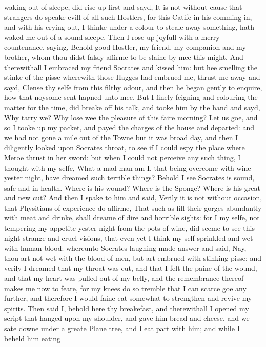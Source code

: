 waking out of sleepe, did rise up first and sayd, It is not without cause that
strangers do speake evill of all such Hostlers, for this Catife in his comming
in, and with his crying out, I thinke under a colour to steale away something,
hath waked me out of a sound sleepe. Then I rose up joyfull with a merry
countenance, saying, Behold good Hostler, my friend, my companion and my
brother, whom thou didst falsly affirme to be slaine by mee this might. And
therewithall I embraced my friend Socrates and kissed him: but hee smelling the
stinke of the pisse wherewith those Hagges had embrued me, thrust me away and
sayd, Clense thy selfe from this filthy odour, and then he began gently to
enquire, how that noysome sent hapned unto mee. But I finely feigning and
colouring the matter for the time, did breake off his talk, and tooke him by
the hand and sayd, Why tarry we? Why lose wee the pleasure of this faire
morning? Let us goe, and so I tooke up my packet, and payed the charges of the
house and departed: and we had not gone a mile out of the Towne but it was
broad day, and then I diligently looked upon Socrates throat, to see if I could
espy the place where Meroe thrust in her sword: but when I could not perceive
any such thing, I thought with my selfe, What a mad man am I, that being
overcome with wine yester night, have dreamed such terrible things? Behold I
see Socrates is sound, safe and in health. Where is his wound? Where is the
Sponge? Where is his great and new cut? And then I spake to him and said,
Verily it is not without occasion, that Physitians of experience do affirme,
That such as fill their gorges abundantly with meat and drinke, shall dreame of
dire and horrible sights: for I my selfe, not tempering my appetite yester
night from the pots of wine, did seeme to see this night strange and cruel
visions, that even yet I think my self sprinkled and wet with human blood:
whereunto Socrates laughing made answer and said, Nay, thou art not wet with
the blood of men, but art embrued with stinking pisse; and verily I dreamed
that my throat was cut, and that I felt the paine of the wound, and that my
heart was pulled out of my belly, and the remembrance thereof makes me now to
feare, for my knees do so tremble that I can scarce goe any further, and
therefore I would faine eat somewhat to strengthen and revive my spirits. Then
said I, behold here thy breakefast, and therewithall I opened my script that
hanged upon my shoulder, and gave him bread and cheese, and we sate downe under
a greate Plane tree, and I eat part with him; and while I beheld him eating
